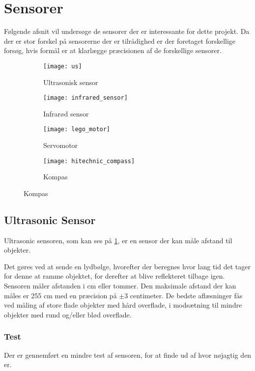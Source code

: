 \section{Sensorer}
Følgende afsnit vil undersøge de sensorer der er interessante for dette projekt.
Da der er stor forskel på sensorerne der er tilrådighed er der foretaget forskellige forsøg, hvis formål er at klarlægge præcisionen af de forskellige sensorer.

\begin{figure}[h]
\centering
\begin{subfigure}[b]{.4\textwidth}
\centering
\texttt{[image: us]}
\caption{Ultrasonisk sensor}
\label{sensor:ultrasonic_sensor}
\end{subfigure}
\begin{subfigure}[b]{.4\textwidth}
\centering
\texttt{[image: infrared\_sensor]}
\caption{Infrarød sensor}
\label{sensor:infraroed_sensor}
\end{subfigure}
\begin{subfigure}[b]{.4\textwidth}
\centering
\texttt{[image: lego\_motor]}
\caption{Servomotor}
\label{sensor:servo_motor}
\end{subfigure}
\begin{subfigure}[b]{.4\textwidth}
\centering
\texttt{[image: hitechnic\_compass]}
\caption{Kompas}
\label{sensor:compass}
\end{subfigure}
\end{figure}

\subsection{Ultrasonic Sensor}
Ultrasonic sensoren, som kan ses på \cref{sensor:ultrasonic_sensor}, er en sensor der kan måle afstand til objekter.

Det gøres ved at sende en lydbølge, hvorefter der beregnes hvor lang tid det tager for denne at ramme objektet, for derefter at blive reflekteret tilbage igen.
Sensoren måler afstanden i cm eller tommer.
Den maksimale afstand der kan måles er 255 cm med en præcision på $\pm$3 centimeter.
De bedste aflæsninger fås ved måling af store flade objekter med hård overflade, i modsætning til mindre objekter med rund og/eller blød overflade.\cite{nxt}

\subsubsection{Test}
Der er gennemført en mindre test af sensoren, for at finde ud af hvor nøjagtig den er.

